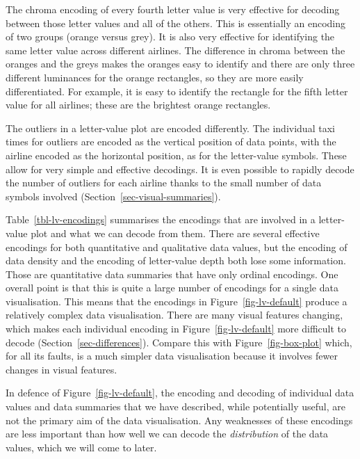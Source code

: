 \documentclass[
  letterpaper,
  DIV=11,
  numbers=noendperiod]{scrreprt}
\begin{document}
The chroma encoding of every fourth letter value is very effective for
decoding between those letter values and all of the others. This is
essentially an encoding of two groups (orange versus grey). It is also
very effective for identifying the same letter value across different
airlines. The difference in chroma between the oranges and the greys
makes the oranges easy to identify and there are only three different
luminances for the orange rectangles, so they are more easily
differentiated. For example, it is easy to identify the rectangle for
the fifth letter value for all airlines; these are the brightest orange
rectangles.

The outliers in a letter-value plot are encoded differently. The
individual taxi times for outliers are encoded as the vertical position
of data points, with the airline encoded as the horizontal position, as
for the letter-value symbols. These allow for very simple and effective
decodings. It is even possible to rapidly decode the number of outliers
for each airline thanks to the small number of data symbols involved
(Section~\ref{sec-visual-summaries}).

Table~\ref{tbl-lv-encodings} summarises the encodings that are involved
in a letter-value plot and what we can decode from them. There are
several effective encodings for both quantitative and qualitative data
values, but the encoding of data density and the encoding of
letter-value depth both lose some information. Those are quantitative
data summaries that have only ordinal encodings. One overall point is
that this is quite a large number of encodings for a single data
visualisation. This means that the encodings in
Figure~\ref{fig-lv-default} produce a relatively complex data
visualisation. There are many visual features changing, which makes each
individual encoding in Figure~\ref{fig-lv-default} more difficult to
decode (Section~\ref{sec-differences}). Compare this with
Figure~\ref{fig-box-plot} which, for all its faults, is a much simpler
data visualisation because it involves fewer changes in visual features.

In defence of Figure~\ref{fig-lv-default}, the encoding and decoding of
individual data values and data summaries that we have described, while
potentially useful, are not the primary aim of the data visualisation.
Any weaknesses of these encodings are less important than how well we
can decode the \emph{distribution} of the data values, which we will
come to later.
\end{document}
